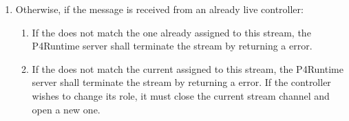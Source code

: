 \documentclass[11pt]{article}
\begin{document}
{\begin{enumerate}
\begin{enumerate}
\item{}
Otherwise, the controller is added to a list of live controllers for
the given (, ) and the server remembers the
controllers ,  and  for this gRPC
channel. See below for the rules to determine if this controller becomes
a primary or backup, and what notifications are sent as a consequence.%
\end{enumerate}%

\item{}
Otherwise, if the  message is received from an
already live controller:%

\begin{enumerate}%

\item{}
If the  does not match the one already assigned to this
stream, the P4Runtime server shall terminate the stream by returning a
 error.%

\item{}
If the  does not match the current  assigned to this
stream, the P4Runtime server shall terminate the stream by returning a
 error. If the controller wishes to change its role,
it must close the current stream channel and open a new one.%


\end{enumerate}
\end{enumerate}}
\end{document}

